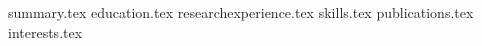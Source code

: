 \documentclass[11pt, a4paper]{awesome-cv}
\newcommand*{\sectiondir}{resume/}
\begin{document}
\makecvheader

{summary.tex}
{education.tex}
{researchexperience.tex}
{skills.tex}
{publications.tex}
{interests.tex}
\end{document}

